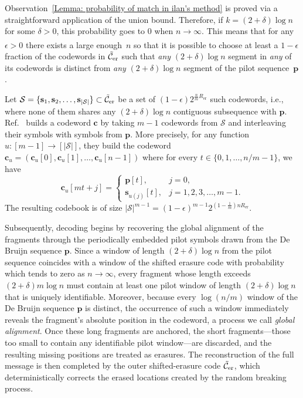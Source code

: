 \documentclass[journal,letterpaper,onecolumn,11pt]{IEEEtran}
\newcommand{\cC}{\mathcal{C}}
\newcommand{\cS}{\mathcal{S}}
\newcommand{\boldc}{\mathbf{c}}
\newcommand{\bolds}{\mathbf{s}}
\begin{document}
Observation~\ref{Lemma: probability of match in ilan's method} is proved via a straightforward application of the union bound. 
Therefore, if $k=(2+\delta)\log n$ for some $\delta>0$, this probability goes to $0$ when $n\xrightarrow[]{}\infty$. 
This means that for any $\epsilon>0$ there exists a large enough~$n$ so that it is possible to choose at least a $1-\epsilon$ fraction of the codewords in $\Tilde{\cC}_{\mathrm{er}}$ such that \textit{any} $(2+\delta)\log n$ segment in \textit{any} of its codewords is distinct from \textit{any} $(2+\delta)\log n$ segment of the pilot sequence~$\mathbf{p}$.

Let $\cS=\{\bolds_1,\bolds_2,\dots,\bolds_{|\cS|}\}\subset\Tilde{\cC}_{\mathrm{er}}$ be a set of $(1-\epsilon)2^{\frac{n}{m}R_{\mathrm{er}}}$ such codewords, i.e., where none of them shares any $(2+\delta)\log n$ contiguous subsequence with $\mathbf{p}$. 
Ref.~\cite{shomorony2021torn} builds a codeword $\boldc$ by taking $m-1$ codewords %
from $\cS$ and interleaving their symbols with symbols from $\mathbf{p}$. 
More precisely, for any function~$u:[m-1]\to[|\cS|]$, they build the codeword $\boldc_u=(\boldc_u[0],\boldc_u[1],\ldots, \boldc_u[n-1])$ where for every $t\in\{0,1,\dots,n/m-1\}$, we have
\begin{equation}
    \boldc_u[mt+j]=
    \begin{cases}
    \mathbf{p}[t], & j= 0, \\
    \bolds_{u(j)}[t], & j=1, 2,3,\dots,m-1.
\end{cases}
\end{equation}
The resulting codebook is of size $|\cS|^{m-1}=(1-\epsilon)^{m-1}2^{(1-\frac{1}{m})nR_{\mathrm{er}}}$. 

Subsequently, decoding begins by recovering the global alignment of the fragments through the periodically embedded pilot symbols drawn from the De Bruijn sequence $\mathbf{p}$. 
Since a window of length $(2+\delta)\log n$ from the pilot sequence coincides with a window of the shifted erasure code with probability which tends to zero as $n \to \infty$, every fragment whose length exceeds $(2+\delta)m\log n$ must contain at least one pilot window of length $(2+\delta)\log n$ that is uniquely identifiable. 
Moreover, because every $\log(n/m)$ window of the De Bruijn sequence $\mathbf{p}$ is distinct, the occurrence of such a window immediately reveals the fragment’s absolute position in the codeword, a process we call \textit{global alignment}. 
Once these long fragments are anchored, the short fragments—those too small to contain any identifiable pilot window—are discarded, and the resulting missing positions are treated as erasures. 
The reconstruction of the full message is then completed by the outer shifted-erasure code $\Tilde{\cC}_{\mathrm{er}}$, which deterministically corrects the erased locations created by the random breaking process.
\end{document}
